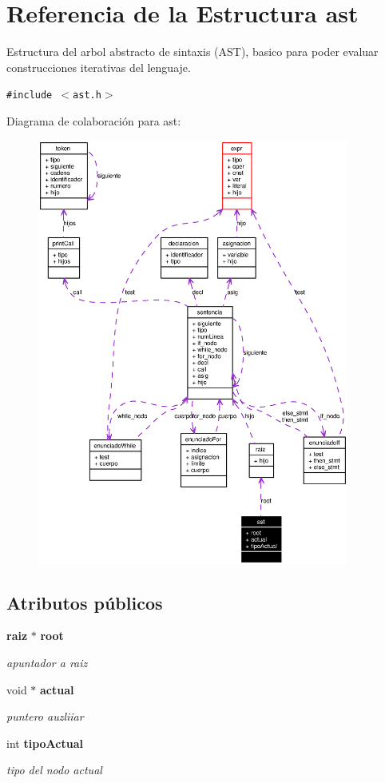 \section{Referencia de la Estructura ast}
\label{structast}
Estructura del arbol abstracto de sintaxis (AST), basico para poder evaluar construcciones iterativas del lenguaje.  


{\tt \#include $<$ast.h$>$}

Diagrama de colaboraci\'{o}n para ast:\begin{figure}[H]
\begin{center}
\leavevmode
\includegraphics[width=290pt]{structast__coll__graph}
\end{center}
\end{figure}
\subsection*{Atributos p\'{u}blicos}
\begin{CompactItemize}
\item 
{\bf raiz} $\ast$ {\bf root}
\begin{CompactList}\small\item\em apuntador a raiz \item\end{CompactList}\item 
void $\ast$ {\bf actual}
\begin{CompactList}\small\item\em puntero auzliiar \item\end{CompactList}\item 
int {\bf tipo\-Actual}
\begin{CompactList}\small\item\em tipo del nodo actual \item\end{CompactList}\end{CompactItemize}


